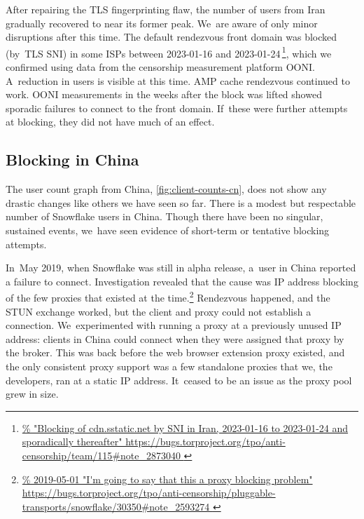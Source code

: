 \documentclass[letterpaper,twocolumn]{article}
\newlength{\urlfootnotesize}
\newcommand{\urlfootnote}[1]{\footnote{
\raggedright\fontsize{\urlfootnotesize}{\urlfootnotesize}\selectfont\url{#1}
}}
\begin{document}
After repairing the TLS fingerprinting flaw,
the number of users from Iran gradually recovered
to near its former peak.
We~are aware of only minor disruptions after this time.
The default rendezvous front domain
was blocked (by~TLS SNI) in some ISPs
between \mbox{2023-01-16} and \mbox{2023-01-24}\,\urlfootnote{
https://bugs.torproject.org/tpo/anti-censorship/team/115\#note_2873040
},
which we confirmed using data from the censorship measurement platform OONI.
A~reduction in users is visible at this time.
AMP cache rendezvous continued to work.
OONI measurements in the weeks after the block was lifted showed sporadic
failures to connect to the front domain.
If~these were further attempts at blocking,
they did not have much of an effect.

\subsection{Blocking in China}
\label{sec:block-cn}


The user count graph from China,
\autoref{fig:client-counts-cn},
does not show any drastic changes
like others we have seen so far.
There is a modest but respectable number of Snowflake users in China.
Though there have been no singular, sustained events,
we~have seen evidence of short-term or tentative
blocking attempts.

In~May 2019, when Snowflake was still in alpha release,
a~user in China reported a failure to connect.
Investigation revealed that the cause was IP address blocking of
the few proxies that existed at the time.\urlfootnote{
https://bugs.torproject.org/tpo/anti-censorship/pluggable-transports/snowflake/30350\#note_2593274
}
Rendezvous happened, and the STUN exchange worked,
but the client and proxy could not establish a connection.
We~experimented with running a proxy
at a previously unused IP address:
clients in China could connect when they were assigned
that proxy by the broker.
This was back before the web browser extension proxy existed,
and the only consistent proxy support was a few standalone proxies
that we, the developers, ran at a static IP address.
It~ceased to be an issue as the proxy pool grew in size.
\end{document}
